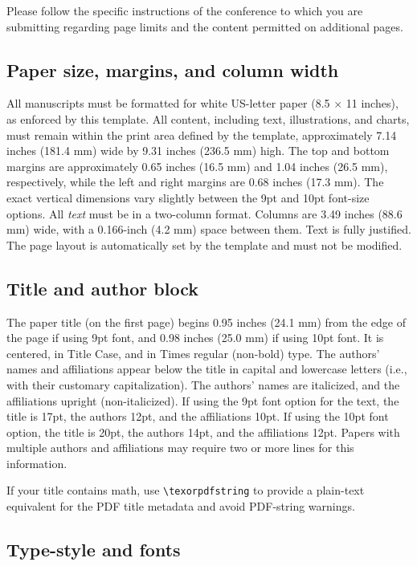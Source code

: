\documentclass[9pt]{ieeeconf}
\begin{document}
Please follow the specific instructions of the conference to which you are
submitting regarding page limits and the content permitted on additional pages.


\subsection{Paper size, margins, and column width}
\label{sec:sizes}

All manuscripts must be formatted for white US-letter paper (8.5 $\times$ 11
inches), as enforced by this template. All content, including text,
illustrations, and charts, must remain within the print area defined by the
template, approximately 7.14 inches (181.4 mm) wide by 9.31 inches (236.5 mm)
high. The top and bottom margins are approximately 0.65 inches (16.5 mm) and
1.04 inches (26.5 mm), respectively, while the left and right margins are 0.68
inches (17.3 mm). The exact vertical dimensions vary slightly between the 9pt
and 10pt font-size options. All {\it text} must be in a two-column format.
Columns are 3.49 inches (88.6 mm) wide, with a 0.166-inch (4.2 mm) space between
them. Text is fully justified. The page layout is automatically set by the
template and must not be modified.

\subsection{Title and author block}
\label{sec:titleauthor}

The paper title (on the first page) begins 0.95 inches (24.1 mm) from the edge
of the page if using 9pt font, and 0.98 inches (25.0 mm) if using 10pt font. It
is centered, in Title Case, and in Times regular (non-bold) type. The authors'
names and affiliations appear below the title in capital and lowercase letters
(i.e., with their customary capitalization). The authors' names are italicized,
and the affiliations upright (non-italicized). If using the 9pt font option for
the text, the title is 17pt, the authors 12pt, and the affiliations 10pt. If
using the 10pt font option, the title is 20pt, the authors 14pt, and the
affiliations 12pt.
Papers with multiple authors and affiliations may require two or more lines for this information.

If your title contains math, use \verb|\texorpdfstring| to provide a plain-text
equivalent for the PDF title metadata and avoid PDF-string warnings.

\subsection{Type-style and fonts}
\label{sec:typestyle}
\end{document}
